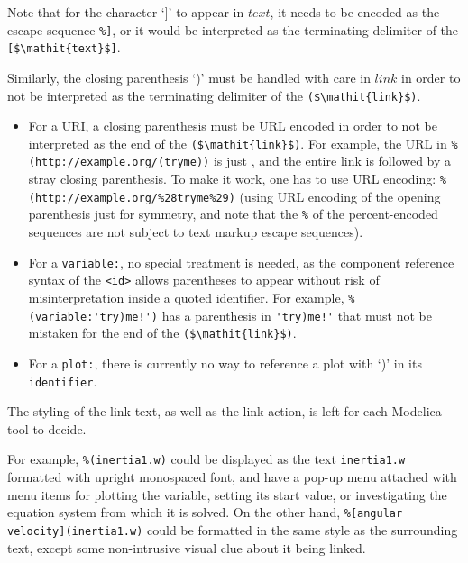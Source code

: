 \begin{nonnormative}
Note that for the character `]' to appear in $\mathit{text}$, it needs to be encoded as the escape sequence \lstinline!%]!, or it would be interpreted as the terminating delimiter of the \lstinline![$\mathit{text}$]!.

Similarly, the closing parenthesis `)' must be handled with care in $\mathit{link}$ in order to not be interpreted as the terminating delimiter of the \lstinline!($\mathit{link}$)!.
\begin{itemize}
\item For a URI, a closing parenthesis must be URL encoded in order to not be interpreted as the end of the \lstinline!($\mathit{link}$)!.  For example, the URL in \lstinline[language={[nocomment]modelica}]!%
\item For a \lstinline!variable:!, no special treatment is needed, as the component reference syntax of the \lstinline!<id>! allows parentheses to appear without risk of misinterpretation inside a quoted identifier.  For example, \lstinline"%(variable:'try)me!')" has a parenthesis in \lstinline"'try)me!'" that must not be mistaken for the end of the \lstinline!($\mathit{link}$)!.
\item For a \lstinline!plot:!, there is currently no way to reference a plot with `)' in its \lstinline!identifier!.
\end{itemize}
\end{nonnormative}

The styling of the link text, as well as the link action, is left for each Modelica
tool to decide.

\begin{nonnormative}
For example, \lstinline!%(inertia1.w)! could be displayed as the text
\lstinline!inertia1.w! formatted with upright monospaced font, and have a pop-up
menu attached with menu items for plotting the variable, setting its start
value, or investigating the equation system from which it is solved.  On the
other hand, \lstinline!%[angular velocity](inertia1.w)! could be formatted in
the same style as the surrounding text, except some non-intrusive visual clue
about it being linked.
\end{nonnormative}

